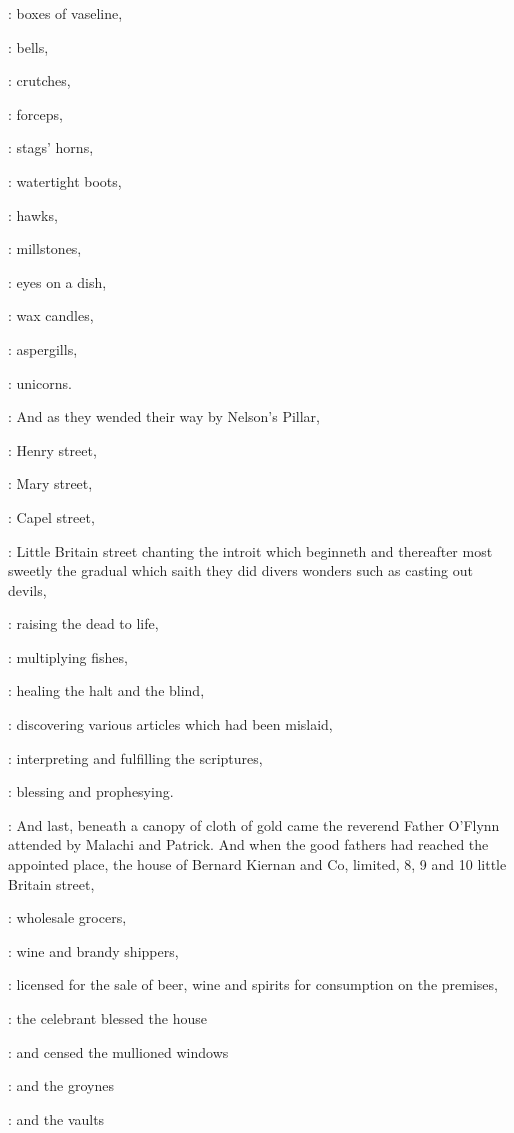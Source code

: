 :
boxes of vaseline,

:
bells,

:
crutches,

:
forceps,

:
stags' horns,

:
watertight boots,

:
hawks,

:
millstones,

:
eyes on a dish,

:
wax candles,

:
aspergills,

:
unicorns.

:
And as they wended their way by Nelson's Pillar,

:
Henry street,

:
Mary street,

:
Capel street,

:
Little Britain street
chanting the introit  which beginneth
 and thereafter most sweetly the gradual
 which saith 
they did divers wonders such as casting out devils,

:
raising the dead to life,

:
multiplying fishes,

:
healing the halt and the blind,

:
discovering various articles which had been mislaid,

:
interpreting and fulfilling the scriptures,

:
blessing and prophesying.

:
And last, beneath
a canopy of cloth of gold came the reverend Father O'Flynn attended by
Malachi and Patrick. And when the good fathers had reached the appointed place,
the house of Bernard Kiernan and Co, limited, 8, 9 and 10 little Britain street,

:
wholesale grocers,

:
wine and brandy shippers,

:
licensed for the sale of beer, wine and spirits for consumption on the premises,

:
the celebrant blessed the house

:
and censed the mullioned windows 

:
and the groynes 

:
and the vaults 

